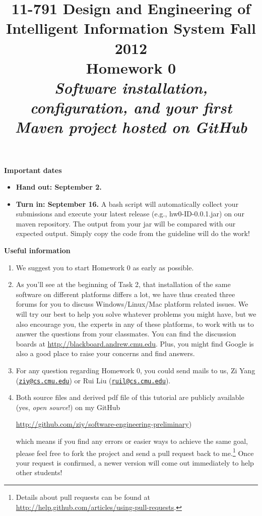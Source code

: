 \documentclass[oneside]{memoir}
\title{{\bfseries 11-791 Design and Engineering of Intelligent Information System Fall 2012\\Homework 0}\\
\vspace{1em}
\itshape\rmfamily Software installation, configuration, and your first Maven project hosted on GitHub}
\date{}
\begin{document}
\begin{titlingpage}
\maketitle

\vspace{-5em}
\textbf{Important dates}
\begin{itemize}
\item \textbf{Hand out: September 2.}
\item \textbf{Turn in: September 16.} A bash script will automatically collect your submissions and execute your latest release (e.g., hw0-ID-0.0.1.jar) on our maven repository. The output from your jar will be compared with our expected output. Simply copy the code from the guideline will do the work!
\end{itemize}

\textbf{Useful information}
\begin{enumerate}
\item We suggest you to start Homework 0 as early as possible.
\item As you'll see at the beginning of Task 2, that installation of the same software on different platforms differs a lot, we have thus created three forums for you to discuss Windows/Linux/Mac platform related issues. We will try our best to help you solve whatever problems you might have, but we also encourage you, the experts in any of these platforms, to work with us to answer the questions from your classmates. You can find the discussion boards at \url{http://blackboard.andrew.cmu.edu}. Plus, you might find Google is also a good place to raise your concerns and find answers.
\item For any question regarding Homework 0, you could send mails to us, Zi Yang (\href{mailto:ziy@cs.cmu.edu}{\nolinkurl{ziy@cs.cmu.edu}}) or Rui Liu (\href{mailto:ruil@cs.cmu.edu}{\nolinkurl{ruil@cs.cmu.edu}}).
\item Both source files and derived pdf file of this tutorial are publicly available (yes, \emph{open source}!) on my GitHub

\url{http://github.com/ziy/software-engineering-preliminary})

which means if you find any errors or easier ways to achieve the same goal, please feel free to fork the project and send a pull request back to me.\footnote{Details about pull requests can be found at \url{http://help.github.com/articles/using-pull-requests}.} Once your request is confirmed, a newer version will come out immediately to help other students!
\end{enumerate}
\end{titlingpage}






\end{document}
